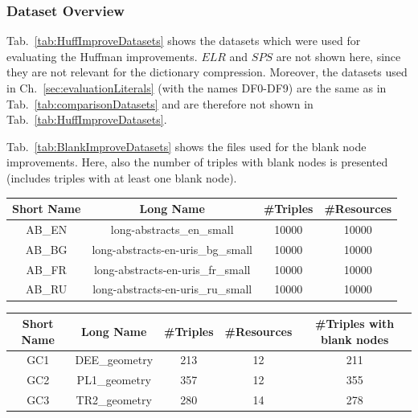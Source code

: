 \subsubsection{Dataset Overview}

Tab.~\ref{tab:HuffImproveDatasets} shows the datasets which were used for evaluating the Huffman improvements. $ELR$ and $SPS$ are not shown here, since they are not relevant for the dictionary compression. Moreover, the datasets used in Ch.~\ref{sec:evaluationLiterals} (with the names DF0-DF9) are the same as in Tab.~\ref{tab:comparisonDatasets} and are therefore not shown in Tab.~\ref{tab:HuffImproveDatasets}.

Tab.~\ref{tab:BlankImproveDatasets} shows the files used for the blank node improvements. Here, also the number of triples with blank nodes is presented (includes triples with at least one blank node).

\begin{center}
	\begin{tabular}{|c|c|c|c|}
		\hline 
		Short Name & Long Name & \#Triples & \#Resources \\ 
		\hline
		AB\_EN & long-abstracts\_en\_small & 10000 & 10000 \\
		\hline
		AB\_BG & long-abstracts-en-uris\_bg\_small & 10000 & 10000  \\
		\hline
		AB\_FR & long-abstracts-en-uris\_fr\_small & 10000 & 10000 \\
		\hline
		AB\_RU & long-abstracts-en-uris\_ru\_small & 10000 & 10000 \\
		\hline
	\end{tabular} 
	\label{tab:HuffImproveDatasets}
\end{center}

\pagebreak
\begin{center}
	\begin{tabular}{|c|c|c|c|c|}
		\hline 
		Short Name & Long Name & \#Triples & \#Resources & \#Triples with blank nodes \\ 
		\hline
		GC1 & DEE\_geometry & 213 & 12 & 211 \\
		\hline
		GC2 & PL1\_geometry & 357 & 12 & 355 \\
		\hline
		GC3 & TR2\_geometry & 280 & 14 & 278 \\
		\hline
	\end{tabular} 
	\label{tab:BlankImproveDatasets}
\end{center}



